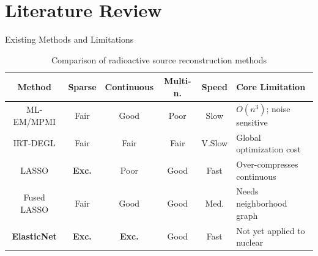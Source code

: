 \documentclass{sysupptthesis}
\begin{document}
\section{Literature Review}

\begin{frame}{Existing Methods and Limitations}
    \begin{table}
        \centering
        \small
        \begin{tabular}{cccccl}
            \hline
            \textbf{Method} & \textbf{Sparse} & \textbf{Continuous} & \textbf{Multi-n.} & \textbf{Speed} & \textbf{Core Limitation} \\
            \hline
            ML-EM/MPMI & Fair & Good & Poor & Slow & $O(n^3)$; noise sensitive \\
            IRT-DEGL & Fair & Fair & Fair & V.Slow & Global optimization cost \\
            LASSO & \textbf{Exc.} & Poor & Good & Fast & Over-compresses continuous \\
            Fused LASSO & Fair & Good & Good & Med. & Needs neighborhood graph \\
            \textbf{ElasticNet} & \textbf{Exc.} & \textbf{Exc.} & Good & Fast & Not yet applied to nuclear \\
            \hline
        \end{tabular}
        \caption{Comparison of radioactive source reconstruction methods}
    \end{table}
\end{frame}
\end{document}
